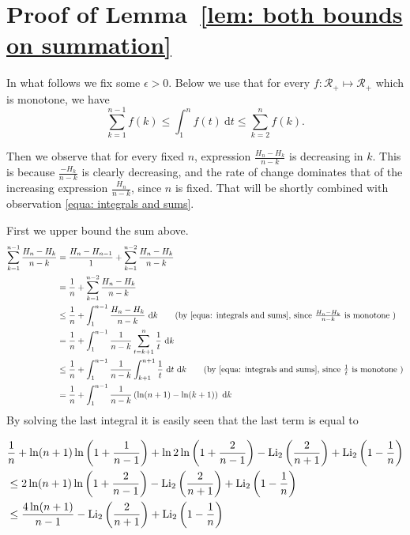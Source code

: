 \documentclass[11pt]{llncs}
\def\d{~\textrm{d}}
\def\Li{\textrm{Li}}
\begin{document}



\appendix
\section{Proof of Lemma~\ref{lem: both bounds on summation} }




In what follows we fix some $\epsilon>0$.
Below we use that for every $f:\mathcal{R}_+\mapsto \mathcal{R}_+$ which is monotone, we have  
\begin{equation}\label{equa: integrals and sums}
\sum_{k=1}^{n-1} f(k) \leq \int_{1}^{n} f(t) \d t \leq \sum_{k=2}^{n} f(k).
\end{equation}

Then we observe that for every fixed $n$, expression $\frac{H_n-H_k}{n-k}$ is decreasing in $k$. This is because $\frac{-H_k}{n-k}$ is clearly decreasing, and the rate of change dominates that of the increasing expression $\frac{H_n}{n-k}$, since $n$ is fixed. That will be shortly combined with observation \eqref{equa: integrals and sums}. 

First we upper bound the sum above. 
\begin{align}
\sum_{k=1}^{n-1}\frac{H_n-H_k}{n-k}
&
=
\frac{H_n-H_{n-1}}{1}+ \sum_{k=1}^{n-2}\frac{H_n-H_k}{n-k} \notag \\
&=
\frac{1}{n}+ \sum_{k=1}^{n-2}\frac{H_n-H_k}{n-k} \notag \\
&\leq 
\frac{1}{n}+ \int_{1}^{n-1}\frac{H_n-H_k}{n-k} \d k  \tag{by \eqref{equa: integrals and sums}, since $\frac{H_n-H_k}{n-k}$ is monotone }\\
&= 
\frac{1}{n}+ \int_{1}^{n-1}\frac1{n-k}\sum_{t=k+1}^n \frac1t \d k  \notag \\
&\leq 
\frac{1}{n}+ \int_{1}^{n-1}\frac1{n-k}\int_{k+1}^{n+1} \frac1t \d t\d k \tag{by \eqref{equa: integrals and sums}, since $\frac{1}{t}$ is monotone } \\
&= 
\frac{1}{n}+ \int_{1}^{n-1}\frac1{n-k} \left( \ln (n+1) - \ln (k+1) \right) \d k \notag
\end{align}
By solving the last integral it is easily seen that the
last term is equal to

\begin{align}
&
\frac{1}{n}+ \ln(n+1)\ln \left(1+\frac{1}{n-1}\right) + \ln 2 \ln \left(1+\frac2{n-1}\right) 
- \Li_2\left(\frac2{n+1}\right) + \Li_2\left(1-\frac1{n}\right) \notag \\
&\leq 
2 \ln(n+1)\ln \left(1+\frac2{n-1}\right) 
- \Li_2\left(\frac2{n+1}\right) + \Li_2\left(1-\frac1{n}\right) \notag \\
&\leq 
\frac{4  \ln(n+1)}{n-1}
- \Li_2\left(\frac2{n+1}\right) + \Li_2\left(1-\frac1{n}\right) \label{equa: last upper bound}
\end{align}
\end{document}
